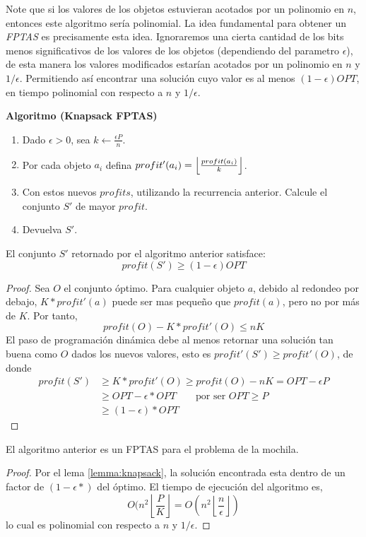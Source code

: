 \documentclass[../np-approximations.tex]{subfiles}
\begin{document}
Note que si los valores de los objetos estuvieran acotados por un 
polinomio en $n$, entonces este algoritmo sería polinomial. La idea 
fundamental para obtener un \emph{FPTAS} es precisamente esta idea.
Ignoraremos una cierta cantidad de los bits menos significativos de 
los valores de los objetos (dependiendo del parametro $\epsilon$), 
de esta manera los valores modificados estarían acotados por un 
polinomio en $n$ y $1/\epsilon$. Permitiendo así encontrar una 
solución cuyo valor es al menos $(1-\epsilon)OPT$, en tiempo 
polinomial con respecto a $n$ y $1/\epsilon$.

\bigskip
\begin{tcolorbox}
	\textbf{Algoritmo (Knapsack FPTAS)}
	\begin{enumerate}
		\item Dado $\epsilon >0$, sea $k \leftarrow \frac{\epsilon P}{n}$.
		\item Por cada objeto $a_i$ defina $profit'(a_i)=\left \lfloor \frac{profit(a_i)}{k} \right \rfloor$.
		\item Con estos nuevos $profits$, utilizando la recurrencia anterior.
			  Calcule el conjunto $S'$ de mayor $profit$.
		\item Devuelva $S'$.
	\end{enumerate}
\end{tcolorbox}
\bigskip

\begin{lemma}
	\label{lemma:knapsack}
	El conjunto $S'$ retornado por el algoritmo anterior satisface:
	$$profit(S') \ge (1-\epsilon)OPT$$
\end{lemma}

\begin{proof}
	Sea $O$ el conjunto óptimo. Para cualquier objeto $a$, debido 
	al redondeo por debajo, $K*profit'(a)$ puede ser mas pequeño 
	que $profit(a)$, pero no por más de $K$. Por tanto,
	$$profit(O)-K*profit'(O) \le nK$$
	El paso de programación dinámica debe al menos retornar una 
	solución tan buena como $O$ dados los nuevos valores, esto es
	$profit'(S') \ge profit'(O)$, de donde
	\begin{align*}
		profit(S') & \ge K*profit'(O) \ge profit(O)-nK 
		= OPT-\epsilon P\\
		           & \ge OPT - \epsilon*OPT            
		\qquad \text{por ser $OPT \ge P$}\\
		           & \ge (1-\epsilon)*OPT              
	\end{align*}
\end{proof}

\begin{theorem}
	El algoritmo anterior es un FPTAS para el problema de la 
	mochila.
\end{theorem}

\begin{proof}
	Por el lema \ref{lemma:knapsack}, la solución encontrada esta 
	dentro de un factor de $(1-\epsilon*)$ del óptimo. El tiempo de 
	ejecución del algoritmo es,
	$$O(n^2 \left \lfloor \frac{P}{K} \right \rfloor
	= O(n^2 \left \lfloor \frac{n}{\epsilon} \right \rfloor)$$
	lo cual es polinomial con respecto a $n$ y $1/\epsilon$.
\end{proof}
\end{document}

